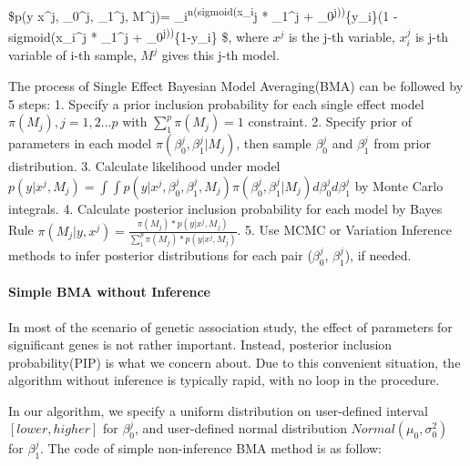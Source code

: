 \documentclass[
]{article}
\begin{document}
\$p(y \textbar{} x\^{}j, \beta\_0\^{}j, \beta\_1\^{}j, M\^{}j)=
\prod\_i\textsuperscript{n(sigmoid(x\_i}j * \beta\_1\^{}j +
\beta\_0\textsuperscript{j))}\{y\_i\}(1 - sigmoid(x\_i\^{}j *
\beta\_1\^{}j + \beta\_0\textsuperscript{j))}\{1-y\_i\} \$, where
\(x^j\) is the j-th variable, \(x_i^j\) is j-th variable of i-th sample,
\(M^j\) gives this j-th model.

The process of Single Effect Bayesian Model Averaging(BMA) can be
followed by 5 steps: 1. Specify a prior inclusion probability for each
single effect model \(\pi(M_j),j=1,2...p\) with \(\sum_1^p\pi(M_j) = 1\)
constraint. 2. Specify prior of parameters in each model
\(\pi(\beta_0^j, \beta_1^j | M_j)\), then sample \(\beta_0^j\) and
\(\beta_1^j\) from prior distribution. 3. Calculate likelihood under
model
\(p(y |x^j, M_j ) = \int \int p(y|x^j, \beta_0^j, \beta_1^j, M_j) \pi(\beta_0^j, \beta_1^j | M_j) d\beta_0^jd\beta_1^j\)
by Monte Carlo integrals. 4. Calculate posterior inclusion probability
for each model by Bayes Rule
\(\pi(M_j | y, x^j) = \frac{\pi(M_j) *p(y |x^j, M_j ) }{\sum_1^p\pi(M_j) *p(y |x^j, M_j )}\).
5. Use MCMC or Variation Inference methods to infer posterior
distributions for each pair (\(\beta_0^j\), \(\beta_1^j\)), if needed.

\hypertarget{simple-bma-without-inference}{%
\paragraph{Simple BMA without
Inference}\label{simple-bma-without-inference}}

In most of the scenario of genetic association study, the effect of
parameters for significant genes is not rather important. Instead,
posterior inclusion probability(PIP) is what we concern about. Due to
this convenient situation, the algorithm without inference is typically
rapid, with no loop in the procedure.

In our algorithm, we specify a uniform distribution on user-defined
interval \([lower, higher]\) for \(\beta_0^j\), and user-defined normal
distribution \(Normal(\mu_0, \sigma_0^2)\) for \(\beta_1^j\). The code
of simple non-inference BMA method is as follow:
\end{document}
